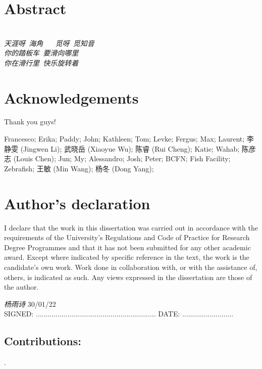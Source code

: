 \documentclass[11pt,twoside]{report}
\begin{document}
\cleardoublepage
\chapter*{Abstract}

\cleardoublepage
\chapter*{}
\vspace*{0.2\textheight}



\noindent\emph{天涯呀~海角 ~~ 觅呀~觅知音} \\[100ex]

\noindent\emph{你的踏板车~要滑向哪里\\你在滑行里~快乐旋转着}


\cleardoublepage
\chapter*{\vspace{-1em} Acknowledgements}

Thank you guys!

Francesco; Erika; Paddy; John; Kathleen; Tom;
Levke; Fergus; Max; Laurent; 李静雯 (Jingwen Li);
武晓岳 (Xiaoyue Wu); 陈睿 (Rui Cheng); Katie; Wahab; 陈彦志 (Louis Chen); Jun;
My; Alessandro;
Josh; Peter;
BCFN; Fish Facility; Zebrafish;
王敏 (Min Wang); 杨冬 (Dong Yang);


\cleardoublepage
\chapter*{Author's declaration}

I declare that the work in this dissertation was carried out in accordance with the requirements of the University's Regulations and Code of Practice for Research Degree Programmes and that it has not been submitted for any other academic award.
Except where indicated by specific reference in the text, the work is the candidate's own work.
Work done in collaboration with, or with the assistance of, others, is indicated as such. Any views expressed in the dissertation are those of the author.

\vspace{1cm}
\vspace{-3pt}

\hspace{2.5cm} {\huge\emph{杨雨诗}} \hspace{5.5cm} 30/01/22 \vspace{-\baselineskip} \vspace{3pt} \\
SIGNED: .............................................................
\qquad
DATE: ..........................

\vspace{1cm}

\section*{Contributions:}

\cite{yang2021pcb}\; . \\
\end{document}
